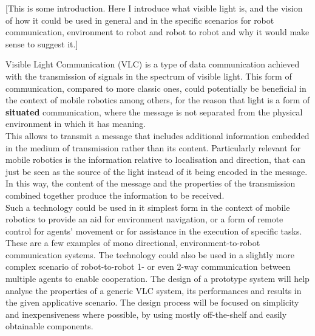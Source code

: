 [This is some introduction.
Here I introduce what visible light is, and the vision of how it could be used in general and in the specific scenarios for robot communication, environment to robot and robot to robot and why it would make sense to suggest it.]

Visible Light Communication (VLC) is a type of data communication achieved with the transmission of signals in the spectrum of visible light.
This form of communication, compared to more classic ones, could potentially be beneficial in the context of mobile robotics among others, for the reason that light is a form of \textbf{situated} communication, where the message is not separated from the physical environment in which it has meaning.\\
This allows to transmit a message that includes additional information embedded in the medium of transmission rather than its content.
Particularly relevant for mobile robotics is the information relative to localisation and direction, that can just be seen as the source of the light instead of it being encoded in the message.
In this way, the content of the message and the properties of the transmission combined together produce the information to be received. \\
Such a technology could be used in it simplest form in the context of mobile robotics to provide an aid for environment navigation, or a form of remote control for agents' movement or for assistance in the execution of specific tasks. 
These are a few examples of mono directional, environment-to-robot communication systems.
The technology could also be used in a slightly more complex scenario of robot-to-robot 1- or even 2-way communication between multiple agents to enable cooperation.
The design of a prototype system will help analyse the properties of a generic VLC system, its performances and results in the given applicative scenario.
The design process will be focused on simplicity and inexpensiveness where possible, by using mostly off-the-shelf and easily obtainable components.\\
